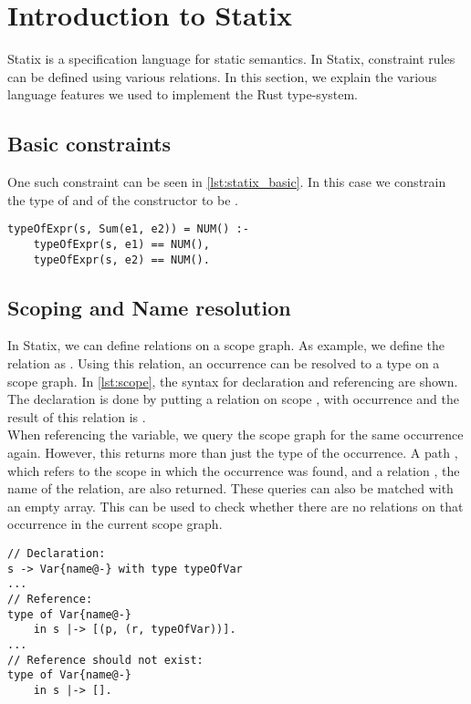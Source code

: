 \section{Introduction to Statix}\label{s:statix}
Statix is a specification language for static semantics. In Statix, constraint rules can be defined using various relations. In this section, we explain the various language features we used to implement the Rust type-system.

\subsection{Basic constraints} 
One such constraint can be seen in \autoref{lst:statix_basic}. In this case we constrain the type of  and  of the  constructor to be .  

 \begin{lstlisting}[showstringspaces=false, frame=single, escapechar=~, label={lst:statix_basic}, caption={Example of simple constraint rule}]
typeOfExpr(s, Sum(e1, e2)) = NUM() :- 
	typeOfExpr(s, e1) == NUM(),
	typeOfExpr(s, e2) == NUM().
\end{lstlisting}
 
\subsection{Scoping and Name resolution}
In Statix, we can define relations on a scope graph. 
As example, we define the relation  as . Using this relation, an occurrence can be resolved to a type on a scope graph. In \autoref{lst:scope}, the syntax for declaration and referencing  are shown. The declaration is done by putting a relation on scope , with occurrence  and the result of this relation is . \\

When referencing the variable, we query the scope graph for the same occurrence again. However, this returns more than just the type of the occurrence. A path , which refers to the scope in which the occurrence was found, and a relation , the name of the relation, are also returned. These queries can also be matched with an empty array. This can be used to check whether there are no relations on that occurrence in the current scope graph. 

\begin{lstlisting}[showstringspaces=false, frame=single, escapechar=~, label={lst:scope}, caption={Declaring and resolving on a scope}]
// Declaration:
s -> Var{name@-} with type typeOfVar
...
// Reference: 
type of Var{name@-} 
    in s |-> [(p, (r, typeOfVar))].
...
// Reference should not exist:
type of Var{name@-} 
    in s |-> [].
\end{lstlisting}

